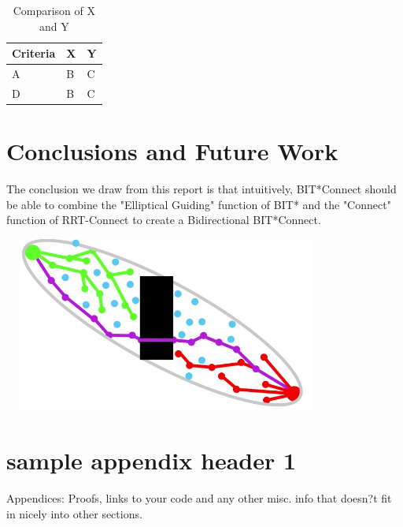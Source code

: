 \documentclass[12pt]{report}
\begin{document}
\begin{table}[ht]
\label{XYComparison}
\begin{center}
\begin{tabular} {l|l|l} %
\hline
\hline
\textbf{Criteria} & \textbf{X} & \textbf{Y}  \\
\hline
A & B & C \\
D & B & C \\
\hline 
\hline
\end{tabular}
\end{center}
\caption{Comparison of  X and Y}
\end{table}

\chapter{Conclusions and Future Work}
The conclusion we draw from this report is that intuitively, BIT*Connect should be able to combine the "Elliptical Guiding" function of BIT* and the "Connect" function of RRT-Connect to create a Bidirectional BIT*Connect.


\includegraphics[height=5.75cm,width = 10.75cm]{bitconnect.png}

 

\appendix 
\chapter{sample appendix header 1}
Appendices: 
Proofs, links to your code and any other misc. info that doesn?t fit in nicely into other sections. 
\end{document}

